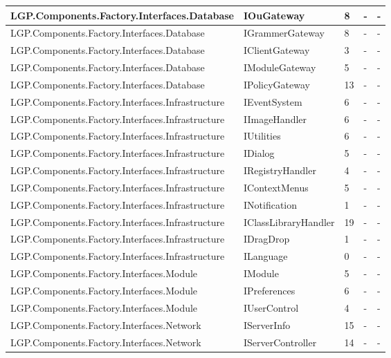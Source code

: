 \begin{table}[h!t]
{\begin{tabular}{ | p{65mm} | p{33mm} | p{10mm} | p{10mm} | p{10mm}  | }
				LGP.Components.Factory.Interfaces.Database & IOuGateway & 8     & -     & -  \\ \hline
				LGP.Components.Factory.Interfaces.Database & IGrammerGateway & 8     & -     & -  \\ \hline
				LGP.Components.Factory.Interfaces.Database & IClientGateway & 3     & -     & -  \\ \hline
				LGP.Components.Factory.Interfaces.Database & IModuleGateway & 5     & -     & -  \\ \hline
				LGP.Components.Factory.Interfaces.Database & IPolicyGateway & 13    & -     & -  \\ \hline
				LGP.Components.Factory.Interfaces.Infrastructure & IEventSystem & 6     & -     & -  \\ \hline
				LGP.Components.Factory.Interfaces.Infrastructure & IImageHandler & 6     & -     & -  \\ \hline
				LGP.Components.Factory.Interfaces.Infrastructure & IUtilities & 6     & -     & -  \\ \hline
				LGP.Components.Factory.Interfaces.Infrastructure & IDialog & 5     & -     & -  \\ \hline
				LGP.Components.Factory.Interfaces.Infrastructure & IRegistryHandler & 4     & -     & -  \\ \hline
				LGP.Components.Factory.Interfaces.Infrastructure & IContextMenus & 5     & -     & -  \\ \hline
				LGP.Components.Factory.Interfaces.Infrastructure & INotification & 1     & -     & -  \\ \hline
				LGP.Components.Factory.Interfaces.Infrastructure & IClassLibraryHandler & \cellcolor{ored}19    & -     & -  \\ \hline
				LGP.Components.Factory.Interfaces.Infrastructure & IDragDrop & 1     & -     & -  \\ \hline
				LGP.Components.Factory.Interfaces.Infrastructure & ILanguage & 0     & -     & -  \\ \hline
				LGP.Components.Factory.Interfaces.Module & IModule & 5     & -     & -  \\ \hline
				LGP.Components.Factory.Interfaces.Module & IPreferences & 6     & -     & -  \\ \hline
				LGP.Components.Factory.Interfaces.Module & IUserControl & 4     & -     & -  \\ \hline
				LGP.Components.Factory.Interfaces.Network & IServerInfo & 15    & -     & -  \\ \hline
				LGP.Components.Factory.Interfaces.Network & IServerController & 14    & -     & -  \\ \hline

\end{tabular}}
\end{table}
